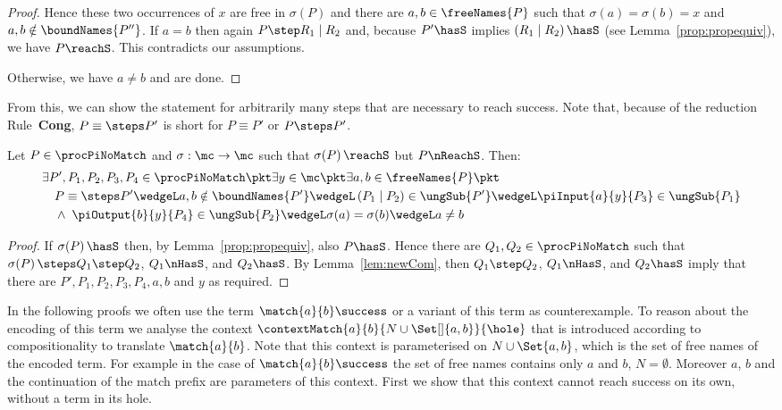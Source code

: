 \documentclass[]{article}
\begin{document}
\begin{proof}
	Hence these two occurrences of $ x $ are free in $ \sigma\!\left( P \right) $ and there are $ a, b \in \freeNames{P} $ such that $ \sigma\!\left( a \right) = \sigma\!\left( b \right) = x $ and $ a, b \notin \boundNames{P''} $. If $ a = b $ then again $ P \step R_1 \mid R_2 $ and, because $ P' \hasS $ implies $ \left( R_1 \mid R_2 \right) \hasS $ (see Lemma~\ref{prop:propequiv}), we have $ P \reachS $. This contradicts our assumptions.
	
	Otherwise, we have $ a \neq b $ and are done.
\end{proof}

From this, we can show the statement for arbitrarily many steps that are
necessary to reach success. Note that, because of the reduction
Rule~\textbf{Cong}, $ P \equiv\steps P' $ is short for $ P \equiv P' $ or $
P \steps P' $.

\begin{lemma}
	\label{prop:newCom}
	Let $ P \in \procPiNoMatch $ and $ \sigma : \mc \to \mc $ such that $ \sigma\!\left( P \right) \reachS $ but $ P \nReachS $.
	Then:
	\begin{align*}
		& \exists P', P_1, P_2, P_3, P_4 \in \procPiNoMatch \pkt \exists y \in \mc \pkt \exists a, b \in \freeNames{P} \pkt\\
		& \hspace{1em} P \equiv\steps P' \wedgeL a, b \notin \boundNames{P'} \wedgeL \left( P_1 \mid P_2 \right) \in \ungSub{P'} \wedgeL \piInput{a}{y}{P_3} \in \ungSub{P_1}\\
		& \hspace{1em} \wedge \; \piOutput{b}{y}{P_4} \in \ungSub{P_2} \wedgeL \sigma(a) = \sigma(b) \wedgeL a \neq b
	\end{align*}
\end{lemma}

\begin{proof}
	If $ \sigma\!\left( P \right) \hasS $ then, by Lemma~\ref{prop:propequiv}, also $ P \hasS $. Hence there are $ Q_1, Q_2 \in \procPiNoMatch $ such that $ \sigma\!\left( P \right) \steps Q_1 \step Q_2 $, $ Q_1 \nHasS $, and $ Q_2 \hasS $. By Lemma~\ref{lem:newCom}, then $ Q_1 \step Q_2 $, $ Q_1 \nHasS $, and $ Q_2 \hasS $ imply that there are $ P', P_1, P_2, P_3, P_4, a, b $ and $ y $ as required.
\end{proof}

In the following proofs we often use the term $ \match{a}{b}\success $ or a variant of this term as counterexample. To reason about the encoding of this term we analyse the context $ \contextMatch{a}{b}{N \cup \Set[]{ a, b }}{\hole} $ that is introduced according to compositionality to translate $ \match{a}{b} $. Note that this context is parameterised on $ N \cup \Set{ a, b } $, which is the set of free names of the encoded term. For example in the case of $ \match{a}{b}\success $ the set of free names contains only $ a $ and $ b $, \ie $ N = \emptyset $. Moreover $ a $, $ b $ and the continuation of the match prefix are parameters of this context. First we show that this context cannot reach success on its own, \ie without a term in its hole.
\end{document}
